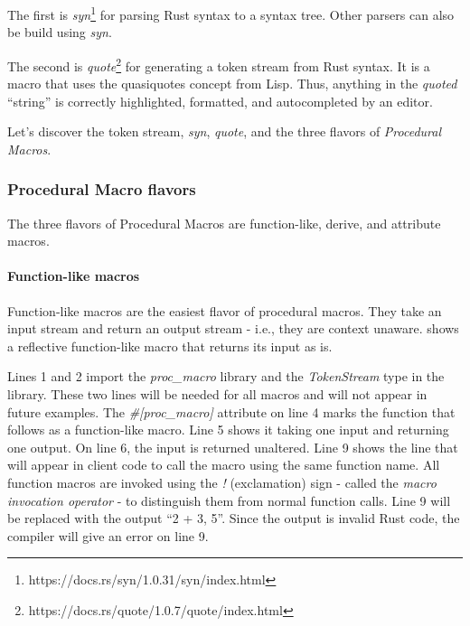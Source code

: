 The first is \textit{syn}\footnote{https://docs.rs/syn/1.0.31/syn/index.html} for parsing Rust syntax to a syntax tree.
Other parsers can also be build using \textit{syn}.

The second is \textit{quote}\footnote{https://docs.rs/quote/1.0.7/quote/index.html} for generating a token stream from Rust syntax.
It is a macro that uses the quasiquotes concept from Lisp.
Thus, anything in the \textit{quoted} ``string'' is correctly highlighted, formatted, and autocompleted by an editor.

Let's discover the token stream, \textit{syn}, \textit{quote}, and the three flavors of \textit{Procedural Macros}.

\subsubsection{Procedural Macro flavors}

The three flavors of Procedural Macros are function-like, derive, and attribute macros.

\paragraph{Function-like macros}
Function-like macros are the easiest flavor of procedural macros.
They take an input stream and return an output stream - i.e., they are context unaware.
 shows a reflective function-like macro that returns its input as is.


Lines 1 and 2 import the \textit{proc\_macro} library and the \textit{TokenStream} type in the library.
These two lines will be needed for all macros and will not appear in future examples.
The \textit{\#[proc\_macro]} attribute on line 4 marks the function that follows as a function-like macro.
Line 5 shows it taking one \colorbox{input}{input} and returning one \colorbox{output}{output}.
On line 6, the input is returned unaltered.
Line 9 shows the line that will appear in client code to call the macro using the same \colorbox{function}{function name}.
All function macros are invoked using the \textit{!} (exclamation) sign - called the \textit{macro invocation operator} - to distinguish them from normal function calls.
Line 9 will be replaced with the \colorbox{output}{output} ``2 + 3, 5''.
Since the output is invalid Rust code, the compiler will give an error on line 9.

